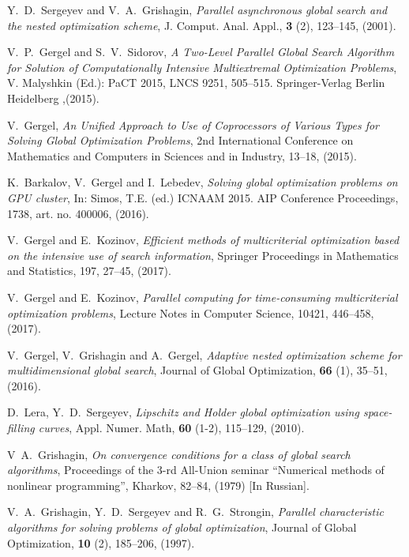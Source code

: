 \documentclass[12pt]{amsart}
\begin{document}
\begin{thebibliography}{20}
Y.~D.~Sergeyev and V.~A.~Grishagin, \textit{Parallel asynchronous global search and the nested optimization scheme}, J. Comput. Anal. Appl., \textbf{3} (2), 123--145, (2001).

V.~P.~Gergel and S.~V.~Sidorov, \textit{A Two-Level Parallel Global Search Algorithm for Solution of Computationally Intensive Multiextremal Optimization Problems}, V. Malyshkin (Ed.): PaCT 2015, LNCS 9251, 505--515. Springer-Verlag Berlin Heidelberg ,(2015).

V.~Gergel, \textit{An Unified Approach to Use of Coprocessors of Various Types for Solving Global Optimization Problems}, 2nd International Conference on Mathematics and Computers in Sciences and in Industry, 13--18, (2015).

K.~Barkalov, V.~Gergel and I.~Lebedev, \textit{Solving global optimization problems on GPU cluster}, In: Simos, T.E. (ed.) ICNAAM 2015. AIP Conference Proceedings, 1738, art. no. 400006, (2016).

V.~Gergel and E.~Kozinov, \textit{Efficient methods of multicriterial optimization based on the intensive use of search information}, Springer Proceedings in Mathematics and Statistics, 197, 27--45, (2017). 

V.~Gergel and E.~Kozinov, \textit{Parallel computing for time-consuming multicriterial optimization problems}, Lecture Notes in Computer Science, 10421, 446--458, (2017).

V.~Gergel, V.~Grishagin and A.~Gergel, \textit{Adaptive nested optimization scheme for multidimensional global search}, Journal of Global Optimization, \textbf{66} (1), 35--51, (2016).

D.~Lera, Y.~D.~Sergeyev, \textit{Lipschitz and Holder global optimization using space-filling curves}, Appl. Numer. Math, \textbf{60} (1-2), 115--129, (2010).

V~A.~Grishagin, \textit{On convergence conditions for a class of global search algorithms}, Proceedings of the 3-rd All-Union seminar ``Numerical methods of nonlinear programming'', Kharkov, 82--84, (1979) [In Russian].

V.~A.~Grishagin, Y.~D.~Sergeyev and R.~G.~Strongin, \textit{Parallel characteristic algorithms for solving problems of global optimization}, Journal of Global Optimization, \textbf{10} (2), 185--206, (1997).


\end{thebibliography}
\end{document}
